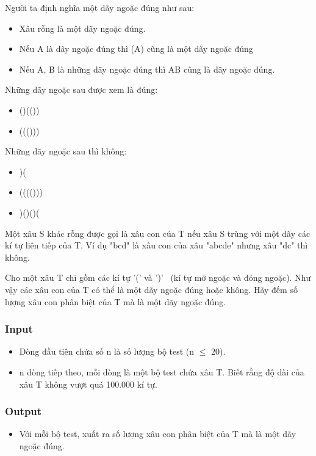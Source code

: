 



   Người ta định nghĩa một dãy ngoặc đúng như sau:  
\begin{itemize}
	\item     Xâu rỗng là một dãy ngoặc đúng.   
	\item     Nếu A là dãy ngoặc đúng thì (A) cũng là một dãy ngoặc đúng   
	\item     Nếu A, B là những dãy ngoặc đúng thì AB cũng là dãy ngoặc đúng.   
\end{itemize}

   Những dãy ngoặc sau được xem là đúng:  
\begin{itemize}
	\item     ()(())   
	\item     ((()))   
\end{itemize}

   Những dãy ngoặc sau thì không:  
\begin{itemize}
	\item     )(   
	\item     (((()))   
	\item     )()()(   
\end{itemize}

   Một xâu S khác rỗng được gọi là xâu con của T nếu xâu S trùng với một dãy các kí tự liên tiếp của T. Ví dụ "bcd" là xâu con của xâu "abcde" nhưng xâu "dc" thì không.  

   Cho một xâu T chỉ gồm các kí tự '(' và ')'  (kí tự mở ngoặc và đóng ngoặc). Như vậy các xâu con của T có thể là một dãy ngoặc đúng hoặc không. Hãy đếm số lượng xâu con phân biệt của T mà là một dãy ngoặc đúng.  

\subsubsection{   Input  }
\begin{itemize}
	\item     Dòng đầu tiên chứa số n là số lượng bộ test (n $\le$ 20).   
	\item     n dòng tiếp theo, mỗi dòng là một bộ test chứa xâu T. Biết rằng độ dài của xâu T không vượt quá 100.000 kí tự.   
\end{itemize}

\subsubsection{   Output  }
\begin{itemize}
	\item     Với mỗi bộ test, xuất ra số lượng xâu con phân biệt của T mà là một dãy ngoặc đúng.   
\end{itemize}

